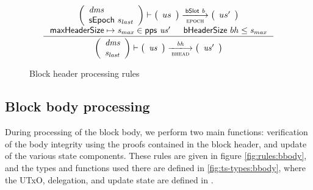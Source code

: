 \documentclass[11pt,a4paper]{article}
\newcommand{\var}[1]{\mathit{#1}}
\newcommand{\fun}[1]{\mathsf{#1}}
\newcommand{\pp}[1]{\mathsf{#1}}
\newcommand{\trans}[2]{\xlongrightarrow[\textsc{#1}]{#2}}
\newcommand{\maxheadersize}{\pp{maxHeaderSize}}
\newcommand{\bhdrsizename}{bHeaderSize}
\newcommand{\bhdrsize}[1]{\fun{\bhdrsizename} ~ #1}
\begin{document}
\begin{figure}[ht]
  \begin{equation*}
    \inference
    {
      {\left(
        \begin{array}{l}
          \var{dms}\\
          \sepoch{s_{last}}\\
        \end{array}
      \right)}
      \vdash
      {\left(
          \begin{array}{l}
            us
          \end{array}
        \right)}
      \trans{epoch}{\bslot{b}}
      {\left(
          \begin{array}{l}
            us'
          \end{array}
        \right)}
      \\
      \\ \maxheadersize \mapsto \var{s_{max}} \in \fun{pps}~\var{us'} & \bhdrsize{bh} \leq \var{s_{max}}
    }
    {
      {\left(
        \begin{array}{l}
          \var{dms}\\
          \var{s_{last}}
        \end{array}
        \right)}
      \vdash
      \left(
        {\begin{array}{c}
           \var{us}
         \end{array}}
     \right)
     \trans{bhead}{\var{bh}}
     \left(
       {\begin{array}{c}
          \var{us'}
        \end{array}}
    \right)
  }
\end{equation*}
\caption{Block header processing rules}
\label{fig:rules:bhead}
\end{figure}

\clearpage

\subsection{Block body processing}

During processing of the block body, we perform two main functions:
verification of the body integrity using the proofs contained in the block
header, and update of the various state components. These rules are given in
figure \ref{fig:rules:bbody}, and the types and functions used there are
defined in \cref{fig:ts-types:bbody}, where the UTxO, delegation, and update
state are defined in \cite{byron_ledger_spec}.
\end{document}
